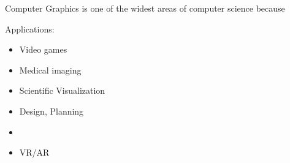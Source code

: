 Computer Graphics is one of the widest areas of computer science 
because 

Applications:
\begin{itemize}
    \item Video games
    \item Medical imaging
    \item Scientific Visualization
    \item Design, Planning
    \item
    \item VR/AR
\end{itemize}
